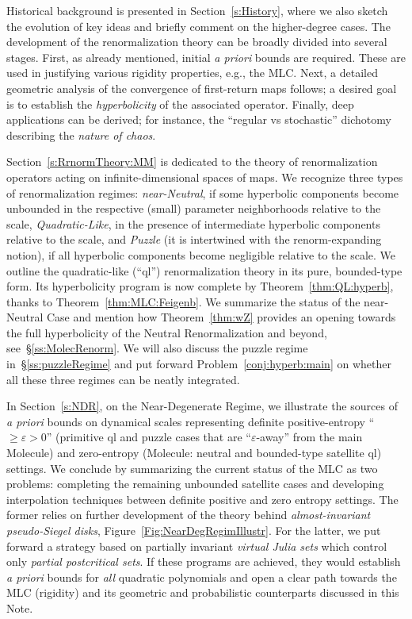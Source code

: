 \documentclass[twoside,leqno]{article}
\theoremstyle{plain}
\begin{document}
Historical background is presented in Section~\ref{s:History}, where we also sketch the evolution of key ideas and briefly comment on the higher-degree cases. The development of the renormalization theory can be broadly divided into several stages. First, as already mentioned, initial \emph{a priori} bounds are required. These are used in justifying various rigidity properties, e.g., the MLC. Next, a detailed geometric analysis of the convergence of first-return maps follows; a desired goal is to establish the \emph{hyperbolicity} of the associated operator. Finally, deep applications can be derived; for instance, the ``regular vs stochastic'' dichotomy describing the \emph{nature of chaos}. 


Section~\ref{s:RrnormTheory:MM} is dedicated to the theory of renormalization operators acting on infinite-dimensional spaces of maps. We recognize three types of renormalization regimes: \emph{near-Neutral}, if some hyperbolic components become unbounded in the respective (small) parameter neighborhoods relative to the scale, \emph{Quadratic-Like}, in the presence of intermediate hyperbolic components relative to the scale, and \emph{Puzzle} (it is intertwined with the renorm-expanding notion), if all hyperbolic components become negligible relative to the scale. We outline the quadratic-like (``ql'') renormalization theory in its pure, bounded-type form. Its hyperbolicity program is now complete by Theorem~\ref{thm:QL:hyperb}, thanks to Theorem~\ref{thm:MLC:Feigenb}. We summarize the status of the near-Neutral Case and mention how Theorem~\ref{thm:wZ} provides an opening towards the full hyperbolicity of the Neutral Renormalization and beyond, see~\S\ref{ss:MolecRenorm}. We will also discuss the puzzle regime in~\S\ref{ss:puzzleRegime} and put forward Problem~\ref{conj:hyperb:main} on whether all these three regimes can be neatly integrated.


In Section~\ref{s:NDR}, on the Near-Degenerate Regime, we illustrate the sources of \emph{a priori} bounds on dynamical scales representing definite positive-entropy ``$\ge \varepsilon>0$'' (primitive ql and puzzle cases that are ``$\varepsilon$-away'' from the main Molecule) and zero-entropy (Molecule: neutral and bounded-type satellite ql) settings. We conclude by summarizing the current status of the MLC as two problems: completing the remaining unbounded satellite cases and developing interpolation techniques between definite positive and zero entropy settings. The former relies on further development of the theory behind \emph{almost-invariant pseudo-Siegel disks}, Figure~\ref{Fig:NearDegRegimIllustr}. For the latter, we put forward a strategy based on partially invariant \emph{virtual Julia sets} which control only \emph{partial postcritical sets}. If these programs are achieved, they would establish \emph{a priori} bounds for \emph{all} quadratic polynomials and open a clear path towards the MLC (rigidity) and its geometric and probabilistic counterparts discussed in this Note.
\end{document}
